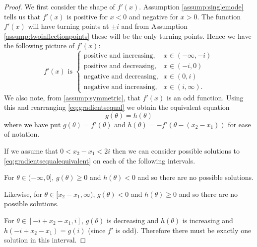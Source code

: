 		\begin{proof}
			We first consider the shape of $f'(x)$. Assumption \ref{assump:singlemode} tells us that $f'(x)$ is positive for $x<0$ and negative for $x>0$. The function $f'(x)$ will have turning points at $\pm i$ and from Assumption \ref{assump:twoinflectionpoints} these will be the only turning points. Hence we have the following picture of $f'(x)$:
			\begin{equation}
				f'(x) \text{ is } 
				\begin{cases}
					\text{positive and increasing,} &x \in (-\infty,-i)\\
					\text{positive and decreasing,} &x \in (-i,0)\\
					\text{negative and decreasing,} &x \in (0,i)\\
					\text{negative and increasing,} &x \in (i,\infty).
				\end{cases}
			\end{equation}
			We also note, from \ref{assump:symmetric}, that $f'(x)$ is an odd function. Using this and rearranging \eqref{eq:gradientsequal} we obtain the equivalent equation
			\begin{equation}
				g(\theta) = h(\theta)
				\label{eq:gradientsequalequivalent}
			\end{equation}
			where we have put $g(\theta) = f'(\theta)$ and $h(\theta) = -f'(\theta - (x_2 - x_1))$ for ease of notation.
			
			If we assume that $0< x_2 - x_1 < 2i$ then we can consider possible solutions to \eqref{eq:gradientsequalequivalent} on each of the following intervals. 
			
			For $\theta \in (-\infty, 0]$, $g(\theta)\geq 0$ and $h(\theta) < 0$ and so there are no possible solutions.
			
			Likewise, for $\theta \in [x_2 - x_1,\infty)$, $g(\theta)<0$ and $h(\theta) \geq 0$ and so there are no possible solutions.
			
			For $\theta \in [-i + x_2 - x_1,i]$, $g(\theta)$ is decreasing and $h(\theta)$ is increasing and $h(-i+x_2 -x_1) = g(i)$ (since $f'$ is odd). Therefore there must be exactly one solution in this interval.
			

\end{proof}

